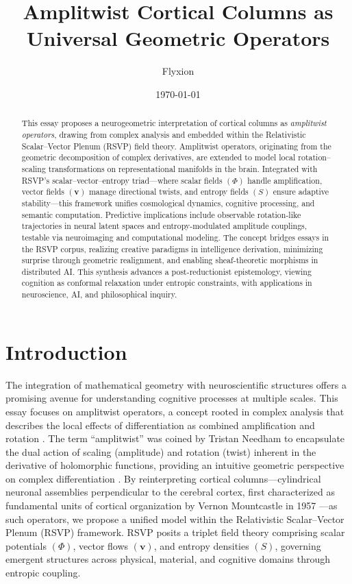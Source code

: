 \documentclass[11pt]{article}
\title{Amplitwist Cortical Columns as Universal Geometric Operators}
\author{Flyxion}
\date{\today}
\begin{document}
\maketitle

\begin{abstract}
This essay proposes a neurogeometric interpretation of cortical columns as \emph{amplitwist operators}, drawing from complex analysis and embedded within the Relativistic Scalar--Vector Plenum (RSVP) field theory. Amplitwist operators, originating from the geometric decomposition of complex derivatives, are extended to model local rotation--scaling transformations on representational manifolds in the brain. Integrated with RSVP's scalar--vector--entropy triad---where scalar fields $(\Phi)$ handle amplification, vector fields $(\mathbf{v})$ manage directional twists, and entropy fields $(S)$ ensure adaptive stability---this framework unifies cosmological dynamics, cognitive processing, and semantic computation. Predictive implications include observable rotation-like trajectories in neural latent spaces and entropy-modulated amplitude couplings, testable via neuroimaging and computational modeling. The concept bridges essays in the RSVP corpus, realizing creative paradigms in intelligence derivation, minimizing surprise through geometric realignment, and enabling sheaf-theoretic morphisms in distributed AI. This synthesis advances a post-reductionist epistemology, viewing cognition as conformal relaxation under entropic constraints, with applications in neuroscience, AI, and philosophical inquiry.
\end{abstract}

\section{Introduction}
The integration of mathematical geometry with neuroscientific structures offers a promising avenue for understanding cognitive processes at multiple scales. This essay focuses on amplitwist operators, a concept rooted in complex analysis that describes the local effects of differentiation as combined amplification and rotation \citep{needham1997visual}. The term ``amplitwist'' was coined by Tristan Needham to encapsulate the dual action of scaling (amplitude) and rotation (twist) inherent in the derivative of holomorphic functions, providing an intuitive geometric perspective on complex differentiation \citep{needham1997visual}. By reinterpreting cortical columns---cylindrical neuronal assemblies perpendicular to the cerebral cortex, first characterized as fundamental units of cortical organization by Vernon Mountcastle in 1957 \citep{mountcastle1957modality}---as such operators, we propose a unified model within the Relativistic Scalar--Vector Plenum (RSVP) framework. RSVP posits a triplet field theory comprising scalar potentials $(\Phi)$, vector flows $(\mathbf{v})$, and entropy densities $(S)$, governing emergent structures across physical, material, and cognitive domains through entropic coupling.
\end{document}
